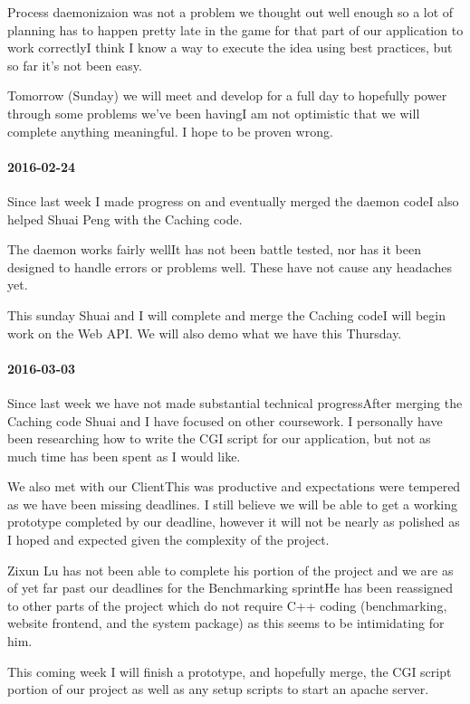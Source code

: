 Process daemonizaion was not a problem we thought out well enough so a lot of planning has to happen pretty late in the game for that part of our application to work correctlyI think I know a way to execute the idea using best practices, but so far it's not been easy.

Tomorrow (Sunday) we will meet and develop for a full day to hopefully power through some problems we've been havingI am not optimistic that we will complete anything meaningful.
I hope to be proven wrong.

\paragraph{2016-02-24}

Since last week I made progress on and eventually merged the daemon codeI also helped Shuai Peng with the Caching code.

The daemon works fairly wellIt has not been battle tested, nor has it been designed to handle errors or problems well.
These have not cause any headaches yet.

This sunday Shuai and I will complete and merge the Caching codeI will begin work on the Web API.
We will also demo what we have this Thursday.

\paragraph{2016-03-03}

Since last week we have not made substantial technical progressAfter merging the Caching code Shuai and I have focused on other coursework.
I personally have been researching how to write the CGI script for our application, but not as much time has been spent as I would like.

We also met with our ClientThis was productive and expectations were tempered as we have been missing deadlines.
I still believe we will be able to get a working prototype completed by our deadline, however it will not be nearly as polished as I hoped and expected given the complexity of the project.

Zixun Lu has not been able to complete his portion of the project and we are as of yet far past our deadlines for the Benchmarking sprintHe has been reassigned to other parts of the project which do not require C++ coding (benchmarking, website frontend, and the system package) as this seems to be intimidating for him.

This coming week I will finish a prototype, and hopefully merge, the CGI script portion of our project as well as any setup scripts to start an apache server.

